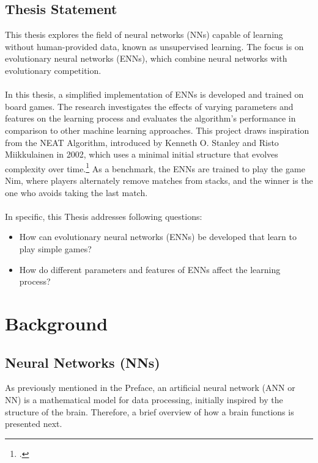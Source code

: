 \documentclass[11pt]{report}
\begin{document}
    \section{Thesis Statement}\label{sec:thesis-statement}
    This thesis explores the field of neural networks (NNs) capable of learning without human-provided data, known as unsupervised learning.
    The focus is on evolutionary neural networks (ENNs), which combine neural networks with evolutionary competition.
    \\ \\
    In this thesis, a simplified implementation of ENNs is developed and trained on board games.
    The research investigates the effects of varying parameters and features on the learning process and evaluates the algorithm’s performance in comparison to other machine learning approaches.
    This project draws inspiration from the NEAT Algorithm, introduced by Kenneth O. Stanley and Risto Miikkulainen in 2002, which uses a minimal initial structure that evolves complexity over time.\footcite[p.105-106]{Neat_02}
    As a benchmark, the ENNs are trained to play the game Nim, where players alternately remove matches from stacks, and the winner is the one who avoids taking the last match.
    \\ \\
    In specific, this Thesis addresses following questions:
    \begin{itemize}
        \item How can evolutionary neural networks (ENNs) be developed that learn to play simple games?
        \item How do different parameters and features of ENNs affect the learning process?
    \end{itemize}


    \chapter{Background}\label{ch:background}


    \section{Neural Networks (NNs)}\label{sec:neural-networks-(nns)}

    As previously mentioned in the Preface, an artificial neural network (ANN or NN) is a mathematical model for data processing, initially inspired by the structure of the brain.
    Therefore, a brief overview of how a brain functions is presented next.
\end{document}
